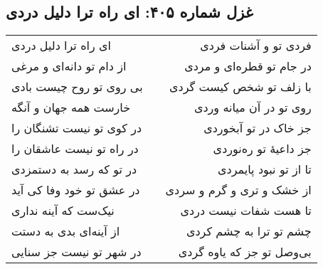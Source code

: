 \begin{center}
\section*{غزل شماره ۴۰۵: ای راه ترا دلیل دردی}
\label{sec:405}
\begin{longtable}{l p{0.5cm} r}
ای راه ترا دلیل دردی
&&
فردی تو و آشنات فردی
\\
از دام تو دانه‌ای و مرغی
&&
در جام تو قطره‌ای و مردی
\\
بی روی تو روح چیست بادی
&&
با زلف تو شخص کیست گردی
\\
خارست همه جهان و آنگه
&&
روی تو در آن میانه وردی
\\
در کوی تو نیست تشنگان را
&&
جز خاک در تو آبخوردی
\\
در راه تو نیست عاشقان را
&&
جز داعیهٔ تو ره‌نوردی
\\
در تو که رسد به دستمزدی
&&
تا از تو نبود پایمردی
\\
در عشق تو خود وفا کی آید
&&
از خشک و تری و گرم و سردی
\\
نیک‌ست که آینه نداری
&&
تا هست شفات نیست دردی
\\
از آینه‌ای بدی به دستت
&&
چشم تو ترا به چشم کردی
\\
در شهر تو نیست جز سنایی
&&
بی‌وصل تو جز که یاوه گردی
\\
\end{longtable}
\end{center}
